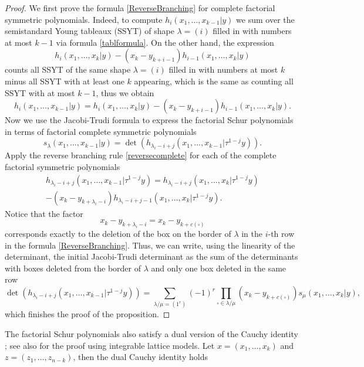 \documentclass[12pt]{amsart}
\numberwithin{equation}{section}
\numberwithin{figure}{section}
\begin{document}
\begin{proof}
    We first prove the formula \eqref{ReverseBranching} for complete factorial symmetric polynomials. Indeed, to compute $h_i(x_1, \ldots, x_{k - 1}|y)$ we sum over the semistandard Young tableaux (SSYT) of shape $\lambda = (i)$ filled in with numbers at most $k-1$ via formula \eqref{tablformula}. On the other hand, the expression
    \[
    h_i(x_1, \ldots, x_k|y) - (x_k - y_{k + i - 1})h_{i - 1}(x_1, \ldots, x_k|y)
    \]
    counts all SSYT of the same shape $\lambda = (i)$ filled in with numbers at most $k$ minus all SSYT with at least one $k$ appearing, which is the same as counting all SSYT with at most $k-1$, thus we obtain
    \begin{equation}
    \label{reversecomplete}
    h_i(x_1, \ldots, x_{k - 1}|y) = h_i(x_1, \ldots, x_k|y) - (x_k - y_{k + i - 1})h_{i - 1}(x_1, \ldots, x_k|y).
    \end{equation}
    Now we use the Jacobi-Trudi formula to express the factorial Schur polynomials in terms of factorial complete symmetric polynomials
    \[
    s_{\lambda}(x_1, \ldots, x_{k - 1}|y) = \det(h_{\lambda_{i} - i + j}(x_1, \ldots, x_{k - 1}|\tau^{1 - j}y)).
    \]
    Apply the reverse branching rule \eqref{reversecomplete} for each of the complete factorial symmetric polynomials 
    \begin{multline*}
    h_{\lambda_i - i + j}(x_1, \ldots, x_{k - 1}|\tau^{1-j}y) = h_{\lambda_i - i + j}(x_1, \ldots, x_{k}|\tau^{1-j}y)\\
    - (x_k - y_{k +\lambda_i - i})h_{\lambda_i - i + j - 1}(x_1, \ldots, x_{k}|\tau^{1-j}y).
    \end{multline*}
    Notice that the factor 
    \[
    x_k - y_{k + \lambda_i - i} = x_k - y_{k + c(\square)}
    \]
    corresponds exactly to the deletion of the box on the border of $\lambda$ in the $i$-th row in the formula \eqref{ReverseBranching}. Thus, we can write, using the linearity of the determinant, the initial Jacobi-Trudi determinant as the sum of the determinants with boxes deleted from the border of $\lambda$ and only one box deleted in the same row
    \[
    \det(h_{\lambda_{i} - i + j}(x_1, \ldots, x_{k - 1}|\tau^{1 - j}y)) = \sum\limits_{\lambda/\mu=(1^r)}(-1)^r \prod\limits_{\square \in \lambda / \mu}(x_k - y_{k + c(\square)}) s_{\mu}(x_1, \ldots, x_k|y),
    \]
    which finishes the proof of the proposition.
\end{proof}
\noindent The factorial Schur polynomials also satisfy a dual version of the Cauchy identity \cite{Mac92}; see also \cite{bump2011factorial} for the proof using integrable lattice models. Let $x=(x_1, \ldots, x_k)$ and $z = (z_1, \ldots, z_{n - k})$, then the dual Cauchy identity holds
\end{document}
